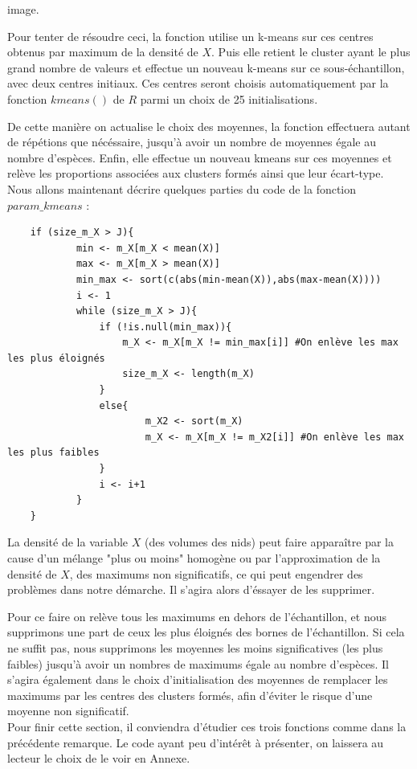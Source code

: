 \documentclass[frenchb]{report}
\newcommand{\1}{\mathbbm{1}}
\theoremstyle{definition}\newtheorem{defn}{Définition}
\theoremstyle{definition}\newtheorem{exm}{Exemple}
\theoremstyle{definition}\newtheorem{nota}{Notation}
\theoremstyle{definition}\newtheorem{rem}{Remarque}
\begin{document}
image.

Pour tenter de résoudre ceci, la fonction utilise un k-means sur ces centres obtenus par maximum de la densité de $X$. Puis elle retient le cluster ayant le plus grand nombre de valeurs et effectue un nouveau k-means sur ce sous-échantillon, avec deux centres initiaux. Ces centres seront choisis automatiquement par la fonction $kmeans()$ de $R$ parmi un choix de 25 initialisations. 

De cette manière on actualise le choix des moyennes, la fonction effectuera autant de répétions que nécéssaire, jusqu'à avoir un nombre de moyennes égale au nombre d'espèces. 
Enfin, elle effectue un nouveau kmeans sur ces moyennes et relève les proportions associées aux clusters formés ainsi que leur écart-type.\\

Nous allons maintenant décrire quelques parties du code de la fonction $param\_kmeans$ : 

\begin{lstlisting}
	if (size_m_X > J){
    		min <- m_X[m_X < mean(X)] 
    		max <- m_X[m_X > mean(X)]
    		min_max <- sort(c(abs(min-mean(X)),abs(max-mean(X))))
    		i <- 1 
    		while (size_m_X > J){
      			if (!is.null(min_max)){
        			m_X <- m_X[m_X != min_max[i]] #On enlève les max les plus éloignés
        			size_m_X <- length(m_X)
      			}
      			else{
        				m_X2 <- sort(m_X)
        				m_X <- m_X[m_X != m_X2[i]] #On enlève les max les plus faibles
      			}
      			i <- i+1
    		}
  	}
\end{lstlisting}

La densité de la variable $X$ (des volumes des nids) peut faire apparaître par la cause d'un mélange "plus ou moins" homogène ou par l'approximation de la densité de $X$, des maximums non significatifs, ce qui peut engendrer des problèmes dans notre démarche. Il s'agira alors d'éssayer de les supprimer.

Pour ce faire on relève tous les maximums en dehors de l'échantillon, et nous supprimons une part de ceux les plus éloignés des bornes de l'échantillon. Si cela ne suffit pas, nous supprimons les moyennes les moins significatives (les plus faibles) jusqu'à avoir un nombres de maximums égale au nombre d'espèces.
Il s'agira également dans le choix d'initialisation des moyennes de remplacer les maximums par les centres des clusters formés, afin d'éviter le risque d'une moyenne non significatif.\\

Pour finir cette section, il conviendra d'étudier ces trois fonctions comme dans la précédente remarque. 
Le code ayant peu d'intérêt à présenter, on laissera au lecteur le choix de le voir en Annexe.
\end{document}
